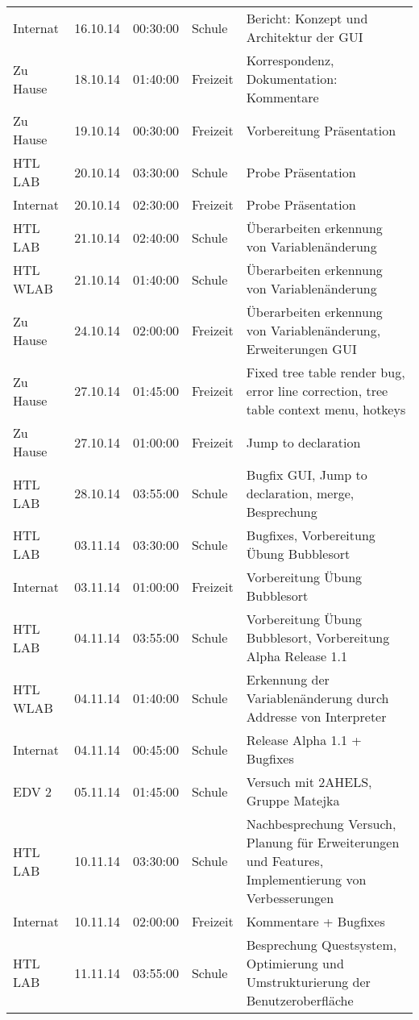 \begin{small}
\begin{longtable}{ p{} p{} p{} p{} p{}}
Internat	& 16.10.14	& 00:30:00	& Schule	& Bericht: Konzept und Architektur der GUI \\
Zu Hause	& 18.10.14	& 01:40:00	& Freizeit	& Korrespondenz, Dokumentation: Kommentare \\
Zu Hause	& 19.10.14	& 00:30:00	& Freizeit	& Vorbereitung Pr\"asentation \\
HTL LAB	& 20.10.14	& 03:30:00	& Schule	& Probe Pr\"asentation \\
Internat	& 20.10.14	& 02:30:00	& Freizeit	& Probe Pr\"asentation \\
HTL LAB	& 21.10.14	& 02:40:00	& Schule	& \"Uberarbeiten erkennung von Variablen\"anderung \\
HTL WLAB	& 21.10.14	& 01:40:00	& Schule	& \"Uberarbeiten erkennung von Variablen\"anderung \\
Zu Hause	& 24.10.14	& 02:00:00	& Freizeit	& \"Uberarbeiten erkennung von Variablen\"anderung, Erweiterungen GUI \\
Zu Hause	& 27.10.14	& 01:45:00	& Freizeit	& Fixed tree table render bug, error line correction, tree table context menu, hotkeys \\
Zu Hause	& 27.10.14	& 01:00:00	& Freizeit	& Jump to declaration \\
HTL LAB	& 28.10.14	& 03:55:00	& Schule	& Bugfix GUI, Jump to declaration, merge, Besprechung \\
HTL LAB	& 03.11.14	& 03:30:00	& Schule	& Bugfixes, Vorbereitung \"Ubung Bubblesort \\
Internat	& 03.11.14	& 01:00:00	& Freizeit	& Vorbereitung \"Ubung Bubblesort \\
HTL LAB	& 04.11.14	& 03:55:00	& Schule	& Vorbereitung \"Ubung Bubblesort, Vorbereitung Alpha Release 1.1 \\
HTL WLAB	& 04.11.14	& 01:40:00	& Schule	& Erkennung der Variablen\"anderung durch Addresse von Interpreter \\
Internat	& 04.11.14	& 00:45:00	& Schule	& Release Alpha 1.1 + Bugfixes \\
EDV 2	& 05.11.14	& 01:45:00	& Schule	& Versuch mit 2AHELS, Gruppe Matejka \\
HTL LAB	& 10.11.14	& 03:30:00	& Schule	& Nachbesprechung Versuch, Planung f\"ur Erweiterungen und Features, Implementierung von Verbesserungen \\
Internat	& 10.11.14	& 02:00:00	& Freizeit	& Kommentare + Bugfixes \\
HTL LAB	& 11.11.14	& 03:55:00	& Schule	& Besprechung Questsystem, Optimierung und Umstrukturierung der Benutzeroberfl\"ache \\

\end{longtable}
\end{small}
